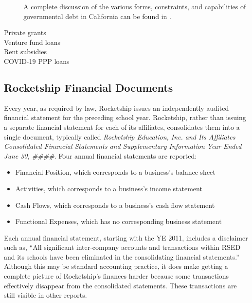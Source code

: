 \begin{description}
  A complete discussion of the various forms, constraints, and capabilities of governmental debt in California can be found in \textcite{CDIAC2023}.
  
  \item[Private grants] 
  \item[Venture fund loans]
  \item[Rent subsidies]
  \item[COVID-19 PPP loans]
\end{description}

\subsection{Rocketship Financial Documents}\indent%
\label{sec:rocketship-financial-docs}

Every year, as required by law, Rocketship issues an independently audited financial statement for the preceding school year. Rocketship, rather than issuing a separate financial statement for each of its affiliates, consolidates them into a single document, typically called \textit{Rocketship Education, Inc. and Its Affiliates Consolidated Financial Statements and Supplementary Information Year Ended June 30, \#\#\#\#}. Four annual financial statements are reported:

\begin{itemize}
  \item Financial Position, which corresponds to a business's balance sheet\\
  \item Activities, which corresponds to a business's income statement\\
  \item Cash Flows, which corresponds to a business's cash flow statement\\
  \item Functional Expenses, which has no corresponding business statement\\
\end{itemize}

Each annual financial statement, starting with the YE 2011, includes a disclaimer such as, ``All significant inter-company accounts and transactions within RSED and its schools have been eliminated in the consolidating financial statements.'' Although this may be standard accounting practice, it does make getting a complete picture of Rocketship's finances harder because some transactions effectively disappear from the consolidated statements. These transactions are still visible in other reports.

